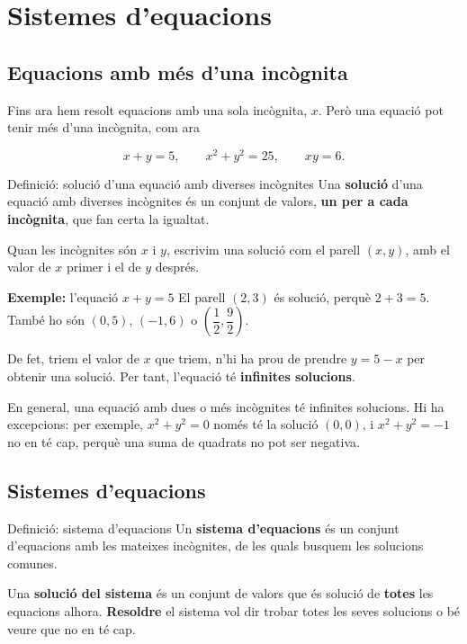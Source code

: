 \section{Sistemes d'equacions}

\subsection{Equacions amb més d'una incògnita}

Fins ara hem resolt equacions amb una sola incògnita, $x$. Però una equació pot tenir més d'una incògnita, com ara

\[
x+y=5, \qquad x^2+y^2=25, \qquad xy=6.
\]

\begin{definicio}{Definició: solució d'una equació amb diverses incògnites}
Una \textbf{solució} d'una equació amb diverses incògnites és un conjunt de valors, \textbf{un per a cada incògnita}, que fan certa la igualtat.

Quan les incògnites són $x$ i $y$, escrivim una solució com el parell $(x,y)$, amb el valor de $x$ primer i el de $y$ després.
\end{definicio}

\begin{exemple}{\textbf{Exemple:} l'equació $x+y=5$}
El parell $(2,3)$ és solució, perquè $2+3=5$. També ho són $(0,5)$, $(-1,6)$ o $\left(\dfrac12,\dfrac92\right)$.

De fet, triem el valor de $x$ que triem, n'hi ha prou de prendre $y=5-x$ per obtenir una solució. Per tant, l'equació té \textbf{infinites solucions}.
\end{exemple}

En general, una equació amb dues o més incògnites té infinites solucions. Hi ha excepcions: per exemple, $x^2+y^2=0$ només té la solució $(0,0)$, i $x^2+y^2=-1$ no en té cap, perquè una suma de quadrats no pot ser negativa.

\subsection{Sistemes d'equacions}

\begin{definicio}{Definició: sistema d'equacions}
Un \textbf{sistema d'equacions} és un conjunt d'equacions amb les mateixes incògnites, de les quals busquem les solucions comunes.

Una \textbf{solució del sistema} és un conjunt de valors que és solució de \textbf{totes} les equacions alhora. \textbf{Resoldre} el sistema vol dir trobar totes les seves solucions o bé veure que no en té cap.
\end{definicio}

